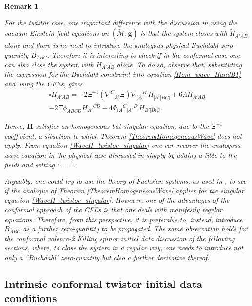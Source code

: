 \documentclass[10pt,a4paper]{article}
\theoremstyle{plain}
\newtheorem{remark}{Remark}
\def\bmg{{\bm g}}
\def\bmH{{\bm H}}
\begin{document}
\begin{remark}
\em{ For the twistor case, one important difference with the
  discussion in \cite{GarVal08c} using the vacuum Einstein field
  equations on $(\tilde{\mathcal{M}},\tilde{\bmg})$ is that the system
  closes with $\tilde{H}_{A'AB}$ alone and there is no need to
  introduce the analogous physical Buchdahl zero-quantity
  $\tilde{B}_{ABC}$.  Therefore it is interesting to check if in the
  conformal case one can also close the system with $H_{A'AB}$ alone.
  To do so, observe that, substituting the expression for the Buchdahl
  constraint into equation \eqref{Hom_wave_HandB1} and using the CFEs,
  gives
\begin{multline}\label{WaveH_twistor_singular}
  \square H_{A'AB} = - 2\Xi^{-1} (\nabla^{C}{}_{A'}\Xi)
  \nabla_{(A}{}^{B'}H_{|B'|BC)}+ 6 \Lambda H_{A'AB} \\-2 \Xi \phi
  _{ABCD}H_{A'}{}^{CD} -4 \Phi_{(A}{}^{C}{}_{|A'}{}^{B'}H_{B'|B)C}.
 \end{multline}

Hence, $\bmH$ satisfies an homogeneous but \emph{singular equation},
due to the $\Xi^{-1}$ coefficient, a situation to which Theorem
\ref{TheoremHomogeneousWave} does not apply.  From equation
\eqref{WaveH_twistor_singular} one can recover the analogous wave
equation in the physical case discussed in \cite{GasVal15} simply by
adding a tilde to the fields and setting $\Xi=1$.

Arguably, one could try to use the theory of \textit{Fuchsian
  systems}, as used in \cite{ChrPaetz13,Pae14a}, to see if the
analogue of Theorem \ref{TheoremHomogeneousWave} applies for the
singular equation \eqref{WaveH_twistor_singular}.  However, one of the
advantages of the conformal approach of the CFEs is that one deals
with manifestly regular equations.  Therefore, from this perspective,
it is preferable to, instead, introduce $B_{ABC}$ as a further
zero-quantity to be propagated.  The same observation holds for the
conformal valence-2 Killing spinor initial data discussion of the
following sections, where, to close the system in a regular way, one
needs to introduce not only a ``Buchdahl" zero-quantity but also a
further derivative thereof.}
\end{remark}


\subsection{Intrinsic conformal twistor initial data conditions}
\label{Sec:IntrinsicTwistor}
\end{document}
